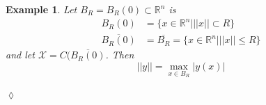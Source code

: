 \documentclass[lecture,12pt,]{pcms-l}
\theoremstyle{example}
\newtheorem{example}{Example}[section]
\begin{document}
\begin{example}
Let $B_R=B_R(0)\subset\mathbb{R}^n$ is
\begin{align*}
B_R(0) &= \{x\in\mathbb{R}^n | ||x||\subset R\} \\
\overline{B_R(0)} &= \overline{B_R} = \{x\in\mathbb{R}^n | ||x||\leq R\}
\end{align*}
and let $\mathcal{X}=C(\overline{B_R(0)}$. Then
$$||y||=\max_{x\in B_R} |y(x)|$$
\end{example}
$\lozenge$
\end{document}
